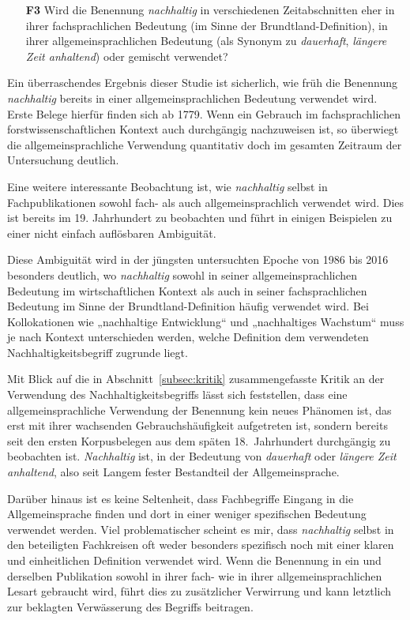 \documentclass[
    german,
    a4paper,%
    12pt,%
    oneside,%
    toc=bibliography,
    final,
]{scrartcl}
\begin{document}
\begin{enumerate}[rightmargin=1cm]
\item[\textbf{F3}] Wird die Benennung \textit{nachhaltig} in verschiedenen Zeitabschnitten eher in ihrer fachsprachlichen Bedeutung (im Sinne der Brundtland-Definition), in ihrer allgemeinsprachlichen Bedeutung (als Synonym zu \textit{dauerhaft}, \textit{längere Zeit anhaltend}) oder gemischt verwendet?
\end{enumerate}

Ein überraschendes Ergebnis dieser Studie ist sicherlich, wie früh die Benennung \textit{nachhaltig} bereits in einer allgemeinsprachlichen Bedeutung verwendet wird. Erste Belege hierfür finden sich ab 1779. Wenn ein Gebrauch im fachsprachlichen forstwissenschaftlichen Kontext auch durchgängig nachzuweisen ist, so überwiegt die allgemeinsprachliche Verwendung quantitativ doch im gesamten Zeitraum der Untersuchung deutlich.

Eine weitere interessante Beobachtung ist, wie \textit{nachhaltig} selbst in Fachpublikationen sowohl fach- als auch allgemeinsprachlich verwendet wird. Dies ist bereits im 19. Jahrhundert zu beobachten und führt in einigen Beispielen zu einer nicht einfach auflösbaren Ambiguität.

Diese Ambiguität wird in der jüngsten untersuchten Epoche von 1986 bis 2016 besonders deutlich, wo \textit{nachhaltig} sowohl in seiner allgemeinsprachlichen Bedeutung im wirtschaftlichen Kontext als auch in seiner fachsprachlichen Bedeutung im Sinne der Brundtland-Definition häufig verwendet wird. Bei Kollokationen wie „nachhaltige Entwicklung“ und „nachhaltiges Wachstum“ muss je nach Kontext unterschieden werden, welche Definition dem verwendeten Nachhaltigkeitsbegriff zugrunde liegt.

Mit Blick auf die in Abschnitt~\ref{subsec:kritik} zusammengefasste Kritik an der Verwendung des Nachhaltigkeitsbegriffs lässt sich feststellen, dass eine allgemeinsprachliche Verwendung der Benennung kein neues Phänomen ist, das erst mit ihrer wachsenden Gebrauchshäufigkeit aufgetreten ist, sondern bereits seit den ersten Korpusbelegen aus dem späten 18.~Jahrhundert durchgängig zu beobachten ist. \textit{Nachhaltig} ist, in der Bedeutung von \textit{dauerhaft} oder \textit{längere Zeit anhaltend}, also seit Langem fester Bestandteil der Allgemeinsprache.

Darüber hinaus ist es keine Seltenheit, dass Fachbegriffe Eingang in die Allgemeinsprache finden und dort in einer weniger spezifischen Bedeutung verwendet werden. Viel problematischer scheint es mir, dass \textit{nachhaltig} selbst in den beteiligten Fachkreisen oft weder besonders spezifisch noch mit einer klaren und einheitlichen Definition verwendet wird. Wenn die Benennung in ein und derselben Publikation sowohl in ihrer fach- wie in ihrer allgemeinsprachlichen Lesart gebraucht wird, führt dies zu zusätzlicher Verwirrung und kann letztlich zur beklagten Verwässerung des Begriffs beitragen.
\end{document}
